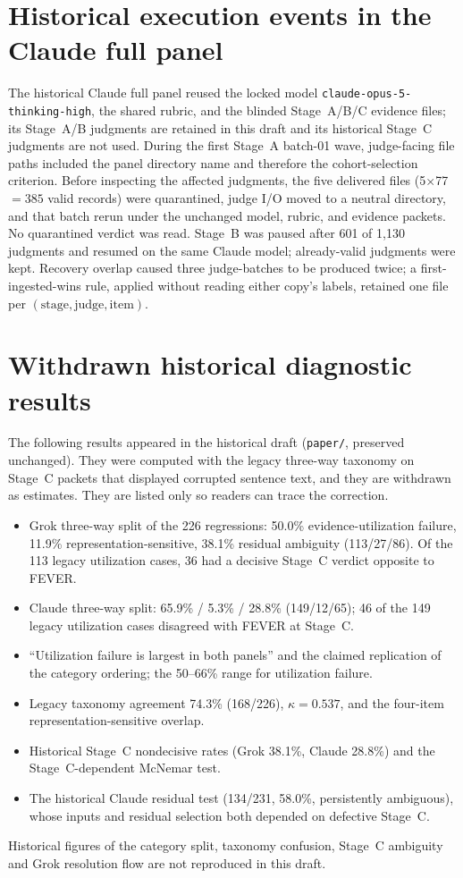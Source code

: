 \section{Historical execution events in the Claude full panel}
\label{app:historical-deviations}

The historical Claude full panel reused the locked model \texttt{claude-opus-5-thinking-high}, the shared rubric, and the blinded Stage~A/B/C evidence files; its Stage~A/B judgments are retained in this draft and its historical Stage~C judgments are not used.
During the first Stage~A batch-01 wave, judge-facing file paths included the panel directory name and therefore the cohort-selection criterion.
Before inspecting the affected judgments, the five delivered files (5$\times$77 $= 385$ valid records) were quarantined, judge I/O moved to a neutral directory, and that batch rerun under the unchanged model, rubric, and evidence packets.
No quarantined verdict was read.
Stage~B was paused after 601 of 1{,}130 judgments and resumed on the same Claude model; already-valid judgments were kept.
Recovery overlap caused three judge-batches to be produced twice; a first-ingested-wins rule, applied without reading either copy's labels, retained one file per $(\mathrm{stage},\mathrm{judge},\mathrm{item})$.

\section{Withdrawn historical diagnostic results}
\label{app:historical}

The following results appeared in the historical draft (\texttt{paper/}, preserved unchanged).
They were computed with the legacy three-way taxonomy on Stage~C packets that displayed corrupted sentence text, and they are withdrawn as estimates.
They are listed only so readers can trace the correction.
\begin{itemize}\sloppy
\item Grok three-way split of the 226 regressions: 50.0\% evidence-utilization failure, 11.9\% representation-sensitive, 38.1\% residual ambiguity (113/27/86). Of the 113 legacy utilization cases, 36 had a decisive Stage~C verdict opposite to FEVER.
\item Claude three-way split: 65.9\% / 5.3\% / 28.8\% (149/12/65); 46 of the 149 legacy utilization cases disagreed with FEVER at Stage~C.
\item ``Utilization failure is largest in both panels'' and the claimed replication of the category ordering; the 50--66\% range for utilization failure.
\item Legacy taxonomy agreement 74.3\% (168/226), $\kappa=0.537$, and the four-item representation-sensitive overlap.
\item Historical Stage~C nondecisive rates (Grok 38.1\%, Claude 28.8\%) and the Stage~C-dependent McNemar test.
\item The historical Claude residual test (134/231, 58.0\%, persistently ambiguous), whose inputs and residual selection both depended on defective Stage~C.
\end{itemize}
Historical figures of the category split, taxonomy confusion, Stage~C ambiguity and Grok resolution flow are not reproduced in this draft.

